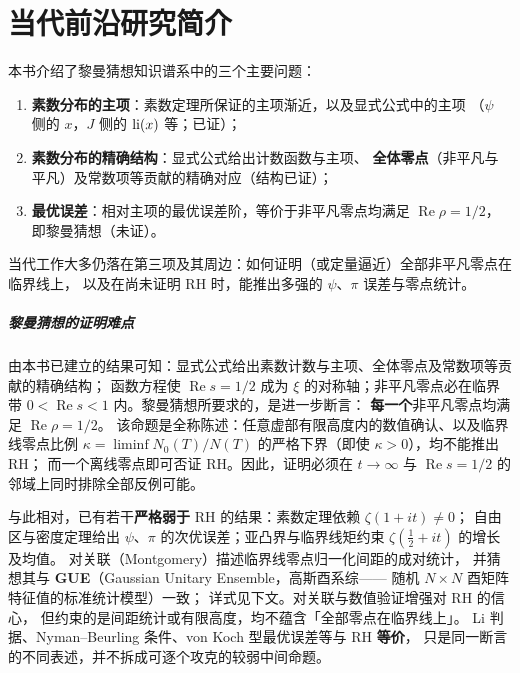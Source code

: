 \chapter{当代前沿研究简介}\label{ch:contemporary_research}

本书介绍了黎曼猜想知识谱系中的三个主要问题：
\begin{enumerate}
  \item \textbf{素数分布的主项}：素数定理所保证的主项渐近，以及显式公式中的主项
        （$\psi$ 侧的 $x$，$J$ 侧的 $\operatorname{li}(x)$ 等；已证）；
  \item \textbf{素数分布的精确结构}：显式公式给出计数函数与主项、
        \textbf{全体零点}（非平凡与平凡）及常数项等贡献的精确对应（结构已证）；
  \item \textbf{最优误差}：相对主项的最优误差阶，等价于非平凡零点均满足 $\operatorname{Re}\rho=1/2$，
        即黎曼猜想（未证）。
\end{enumerate}
当代工作大多仍落在第三项及其周边：如何证明（或定量逼近）全部非平凡零点在临界线上，
以及在尚未证明 RH 时，能推出多强的 $\psi$、$\pi$ 误差与零点统计。

\paragraph{黎曼猜想的证明难点}
由本书已建立的结果可知：显式公式给出素数计数与主项、全体零点及常数项等贡献的精确结构；
函数方程使 $\operatorname{Re}s=1/2$ 成为 $\xi$ 的对称轴；非平凡零点必在临界带
$0<\operatorname{Re}s<1$ 内。黎曼猜想所要求的，是进一步断言：
\textbf{每一个}非平凡零点均满足 $\operatorname{Re}\rho=1/2$。
该命题是全称陈述：任意虚部有限高度内的数值确认、以及临界线零点比例
$\kappa=\liminf N_0(T)/N(T)$ 的严格下界（即使 $\kappa>0$），均不能推出 RH；
而一个离线零点即可否证 RH。因此，证明必须在 $t\to\infty$ 与
$\operatorname{Re}s=1/2$ 的邻域上同时排除全部反例可能。

与此相对，已有若干\textbf{严格弱于} RH 的结果：素数定理依赖 $\zeta(1+it)\neq 0$；
自由区与密度定理给出 $\psi$、$\pi$ 的次优误差；亚凸界与临界线矩约束
$\zeta(\frac12+it)$ 的增长及均值。
对关联（Montgomery）描述临界线零点归一化间距的成对统计，
并猜想其与 \textbf{GUE}（Gaussian Unitary Ensemble，高斯酉系综——
随机 $N\times N$ 酉矩阵特征值的标准统计模型）一致；
详式见下文。对关联与数值验证增强对 RH 的信心，
但约束的是间距统计或有限高度，均不蕴含「全部零点在临界线上」。
Li 判据、Nyman--Beurling 条件、von Koch 型最优误差等与 RH \textbf{等价}，
只是同一断言的不同表述，并不拆成可逐个攻克的较弱中间命题。

